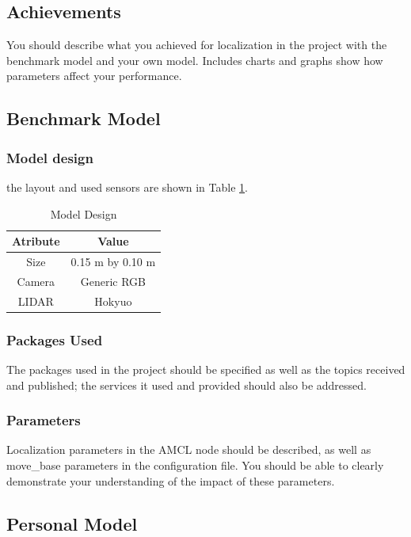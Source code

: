 \documentclass[10pt,journal,compsoc]{IEEEtran}
\begin{document}
\subsection{Achievements}
You should describe what you achieved for localization in the project with the benchmark model and your own model. Includes charts and graphs show how parameters affect your performance. 

\subsection{Benchmark Model}
\subsubsection{Model design}
the layout and used sensors are shown in Table \ref{table:model_design}.
\begin{table}[ht]
      \caption{Model Design}
      \label{table:model_design}
      \begin{center}
      \begin{tabular}{|c|c|}
      \hline
      Atribute & Value \\
      \hline\hline
      \hline
      Size & 0.15 m by 0.10 m \\
      \hline
      Camera & Generic RGB  \\
      \hline
      LIDAR & Hokyuo  \\
      \hline
      \end{tabular}
      \end{center}
\end{table}
\subsubsection{Packages Used}
The packages used in the project should be specified as well as the topics received and published; the services it used and provided should also be addressed. 
\subsubsection{Parameters}
Localization parameters in the AMCL node should be described, as well as move\_base parameters in the configuration file. You should be able to clearly demonstrate your understanding of the impact of these parameters.


\subsection{Personal Model}
\end{document}

